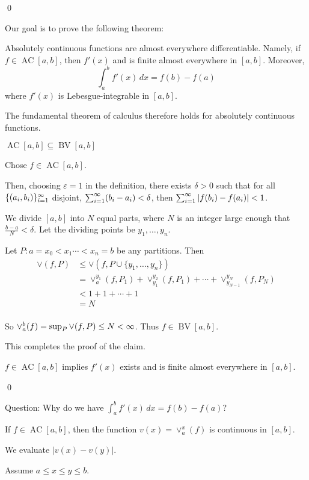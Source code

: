 \documentclass[x11names,reqno,14pt]{extarticle}
\newcommand{\seq}[2][\oo]{_{#2 = 1}^#1}
\DeclareMathOperator{\BV}{BV}
\DeclareMathOperator{\AC}{AC}
\begin{document}
\qed

Our goal is to prove the following theorem:
\thm

Absolutely continuous functions are almost everywhere differentiable. Namely, if $f \in \AC[a,b]$, then $f'(x)$ and is finite almost everywhere in $[a, b]$. Moreover, 
\[
\int_a^bf'(x)\,dx = f(b) - f(a)
\]
where $f'(x)$ is Lebesgue-integrable in $[a, b]$.

\rem The fundamental theorem of calculus therefore holds for absolutely continuous functions. 

\proof 

\prop $\AC[a,b]\subseteq\BV[a,b]$

\proof

Chose $f \in \AC[a,b]$.

Then, choosing $\varepsilon = 1$ in the definition, there exists $\delta>0$ such that for all $\{(a_i,b_i)\}\seq{i}$ disjoint, $\sum\seq{i}(b_i - a_i) < \delta$, then $\sum\seq{i}|f(b_i) - f(a_i)| < 1$. 

We divide $[a, b]$ into $N$ equal parts, where $N$ is an integer large enough that $\frac{b - a}{N} < \delta$. Let the dividing points be $y_1, \dots, y_n$.

Let $P:a = x_0 < x_1 \cdots < x_n = b$ be any partitions. Then
\begin{align*}
\vee(f, P) & \leq \vee(f, P \cup \{y_1, \dots, y_n\}) \\
			  & = \vee_a^{y_1}(f, P_1) + \vee_{y_1}^{y_2}(f, P_1) + \cdots + \vee_{y_{N - 1}}^{y_N}(f, P_N) \\ 
			  & < 1 + 1 + \cdots + 1 \\
			  & = N \\
\end{align*}

So $\vee_a^b(f) = \sup_{P}\vee(f, P) \leq N < \infty$. Thus $f \in \BV[a, b]$. 

This completes the proof of the claim. 

\cor $f \in \AC[a,b]$ implies $f'(x)$ exists and is finite almost everywhere in $[a, b]$. 

\qed

Question: Why do we have $\int_a^bf'(x)\,dx = f(b) - f(a)$? 

\prop If $f \in \AC[a,b]$, then the function $v(x) = \vee_a^x(f)$ is continuous in $[a, b]$. 

\proof

We evaluate $|v(x) - v(y)|$.

Assume $a \leq x \leq y \leq b$. 
\end{document}
